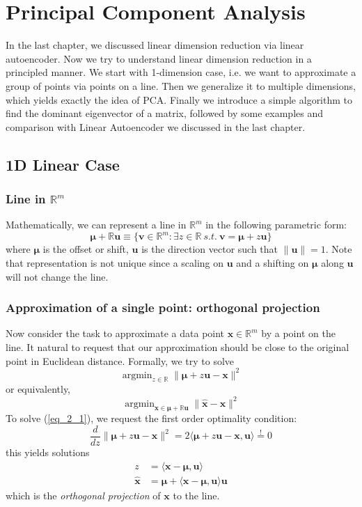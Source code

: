 \documentclass[../book-template.tex]{subfiles}
\begin{document}
\chapter{Principal Component Analysis}
In the last chapter, we discussed linear dimension reduction via linear autoencoder. Now we try to understand linear dimension reduction in a principled manner. We start with 1-dimension case, i.e. we want to approximate a group of points via points on a line. Then we generalize it to multiple dimensions, which yields exactly the idea of PCA. Finally we introduce a simple algorithm to find the dominant eigenvector of a matrix, followed by some examples and comparison with Linear Autoencoder we discussed in the last chapter.
\section{1D Linear Case}
\subsection{Line in \texorpdfstring{$\mathbb{R}^m$}{Rm}}
Mathematically, we can represent a line in $\mathbb{R}^m$ in the following parametric form:
\begin{equation*}
    \bm{\mu} + \mathbb{R}\bm{u} \equiv \{\bm{v}\in \mathbb{R}^m:\exists z\in \mathbb{R}\ s.t.\ \bm{v}=\bm{\mu} + z\bm{u} \}
\end{equation*}
where $\bm{\mu}$ is the offset or shift, $\bm{u}$ is the direction vector such that $\|\bm{u}\|=1$. Note that representation is not unique since a scaling on $\bm{u}$ and a shifting on $\bm{\mu}$ along $\bm{u}$ will not change the line. 
\subsection{Approximation of a single point: orthogonal projection}
Now consider the task to approximate a data point $\bm{x}\in\mathbb{R}^m$ by a point on the line. It natural to request that our approximation should be close to the original point in Euclidean distance. Formally, we try to solve
\begin{equation}\label{eq_2_1}
    \mathop{\arg\min}_{z\in\mathbb{R}}\|\bm{\mu}+z\bm{u}-\bm{x}\|^2
\end{equation}
or equivalently,
\begin{equation*}
    \mathop{\arg\min}_{\hat{\bm{x}}\in \bm{\mu} + \mathbb{R}\bm{u}}\|\hat{\bm{x}}-\bm{x}\|^2
\end{equation*}
To solve (\ref{eq_2_1}), we request the first order optimality condition:
\begin{equation*}
    \frac{d}{dz}\|\bm{\mu}+z\bm{u}-\bm{x}\|^2 = 2\langle \bm{\mu}+z\bm{u}-\bm{x}, \bm{u}\rangle \overset{!}{=}0
\end{equation*}
this yields solutions
\begin{align*}
    z &= \langle \bm{x}-\bm{\mu},\bm{u} \rangle\\
    \hat{\bm{x}} &= \bm{\mu} + \langle \bm{x}-\bm{\mu},\bm{u} \rangle \bm{u}
\end{align*}
which is the \emph{orthogonal projection} of $\bm{x}$ to the line. 
\end{document}
